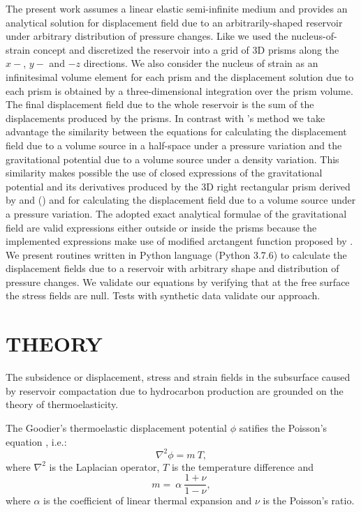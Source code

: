 \documentclass[journal abbreviation, manuscript]{copernicus}
\begin{document}
The present work assumes a linear elastic semi-infinite medium and provides an analytical solution for displacement field due to an arbitrarily-shaped reservoir under arbitrary distribution of pressure changes. 
Like \cite{Munoz&Roehl17} we used the nucleus-of-strain concept and discretized the
reservoir into a grid of 3D prisms along the $x-$, $y-$ and $-z$ directions.
We also consider the nucleus of strain as an infinitesimal volume element  for each prism and the displacement solution due to each prism is obtained by a three-dimensional integration over the prism volume. 
The final displacement field due to the whole reservoir is the sum of the displacements produced by the prisms. 
In contrast with \cite{Munoz&Roehl17}'s method we take advantage the similarity between 
the  equations for calculating the displacement field due to a volume source in a half-space under a pressure variation and the gravitational potential due to a volume source under a density variation.
This similarity makes possible the use of closed expressions of the gravitational potential and its derivatives produced by the 3D right rectangular prism derived by \cite{Nagyetal2000} and (\citeyear{Nagyetal2002}) and \cite{Fukushima2020}  for calculating the displacement field due to a volume source under a pressure variation.
The adopted exact analytical formulae of the gravitational field  are valid expressions either outside or inside the prisms because the implemented expressions make use of  modified arctangent function proposed by \cite{Fukushima2020}. 
We present routines written in Python language (Python 3.7.6)  to calculate the displacement fields due to a reservoir with arbitrary shape and distribution of pressure changes. 
We validate our equations by verifying that at the free surface the stress fields are null.
Tests with synthetic data validate our approach. 

\section{THEORY}

The subsidence or displacement, stress and strain fields in the subsurface caused by reservoir compactation due to hydrocarbon production are grounded on the theory of thermoelasticity. 

The Goodier’s thermoelastic displacement potential $\phi$ satifies the Poisson's equation \citep{Goodier37}, i.e.:
\begin{equation}
\nabla^{2} \phi =  m \: T,
\label{eq:poisson}
\end{equation}
where $\nabla^{2}$ is the Laplacian operator, $T $ is the temperature difference and 
\begin{equation}
m =  \:  \alpha \: \frac{1 + \nu}{ 1 -\nu},
\label{eq:m}
\end{equation}
where $\alpha$  is the coefficient of linear thermal expansion and $\nu$ is the Poisson's ratio.
\end{document}
